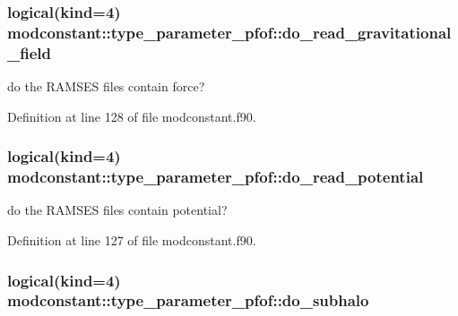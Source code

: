 \subsubsection[{\texorpdfstring{do\+\_\+read\+\_\+gravitational\+\_\+field}{do_read_gravitational_field}}]{\setlength{\rightskip}{0pt plus 5cm}logical(kind=4) modconstant\+::type\+\_\+parameter\+\_\+pfof\+::do\+\_\+read\+\_\+gravitational\+\_\+field}\hypertarget{structmodconstant_1_1type__parameter__pfof_aa8c19ebe7cca7545effc17c2162557cb}{}\label{structmodconstant_1_1type__parameter__pfof_aa8c19ebe7cca7545effc17c2162557cb}


do the R\+A\+M\+S\+ES files contain force? 



Definition at line 128 of file modconstant.\+f90.

\subsubsection[{\texorpdfstring{do\+\_\+read\+\_\+potential}{do_read_potential}}]{\setlength{\rightskip}{0pt plus 5cm}logical(kind=4) modconstant\+::type\+\_\+parameter\+\_\+pfof\+::do\+\_\+read\+\_\+potential}\hypertarget{structmodconstant_1_1type__parameter__pfof_aba812b01af16a40aa26a33136619786a}{}\label{structmodconstant_1_1type__parameter__pfof_aba812b01af16a40aa26a33136619786a}


do the R\+A\+M\+S\+ES files contain potential? 



Definition at line 127 of file modconstant.\+f90.

\subsubsection[{\texorpdfstring{do\+\_\+subhalo}{do_subhalo}}]{\setlength{\rightskip}{0pt plus 5cm}logical(kind=4) modconstant\+::type\+\_\+parameter\+\_\+pfof\+::do\+\_\+subhalo}\hypertarget{structmodconstant_1_1type__parameter__pfof_a9f6178ca41c0ae971922f15f5399b2b5}{}\label{structmodconstant_1_1type__parameter__pfof_a9f6178ca41c0ae971922f15f5399b2b5}


